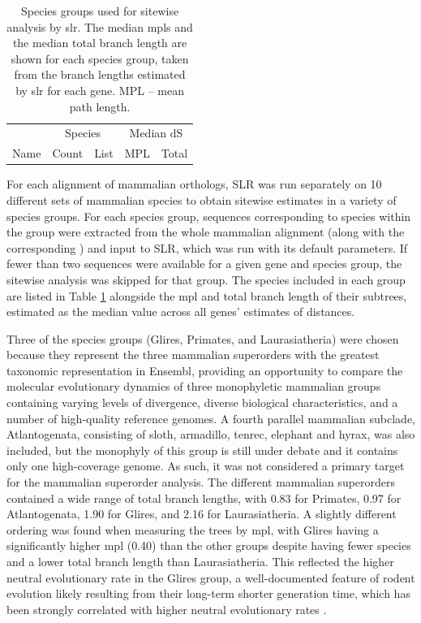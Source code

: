 \begin{table}
\centering \footnotesize
\begin{tabular}{lrb{8cm}rr}
\toprule
 & \multicolumn{2}{c}{Species} & \multicolumn{2}{c}{Median dS} \\
\cmidrule(r){2-3} \cmidrule{4-5}
Name & Count & List & MPL & Total \\
  \midrule

\bottomrule
\end{tabular}
\caption{Species groups used for sitewise analysis by \ac{slr}. The
  median \acp{mpl} and the median total branch length are shown for
  each species group, taken from the \ntrees branch lengths estimated
  by \ac{slr} for each gene. MPL -- mean path length.}
\label{table_species_set_summary}
\end{table}

For each alignment of mammalian orthologs, SLR was run separately on
10 different sets of mammalian species to obtain sitewise estimates in
a variety of species groups. For each species group, sequences
corresponding to species within the group were extracted from the
whole mammalian alignment (along with the corresponding \subtr) and
input to SLR, which was run with its default parameters. If fewer than
two sequences were available for a given gene and species group, the
sitewise analysis was skipped for that group. The species included in
each group are listed in Table \ref{table_species_set_summary}
alongside the \acf{mpl} and total branch length of their subtrees,
estimated as the median value across all \ntrees genes' estimates of
\ds distances.

Three of the species groups (Glires, Primates, and Laurasiatheria) were
chosen because they represent the three mammalian superorders with the
greatest taxonomic representation in Ensembl, providing an opportunity
to compare the molecular evolutionary dynamics of three monophyletic
mammalian groups containing varying levels of divergence, diverse
biological characteristics, and a number of high-quality reference
genomes. A fourth parallel mammalian subclade, Atlantogenata,
consisting of sloth, armadillo, tenrec, elephant and hyrax, was also
included, but the monophyly of this group is still under debate
\citep{Murphy2007,Churakov2009} and it contains only one high-coverage
genome. As such, it was not considered a primary target for the
mammalian superorder analysis. The different mammalian superorders
contained a wide range of total branch lengths, with 0.83 for
Primates, 0.97 for Atlantogenata, 1.90 for Glires, and 2.16 for
Laurasiatheria. A slightly different ordering was found when measuring
the trees by \ac{mpl}, with Glires having a significantly higher
\ac{mpl} (0.40) than the other groups despite having fewer species and
a lower total branch length than Laurasiatheria. This reflected the
higher neutral evolutionary rate in the Glires group, a
well-documented feature of rodent evolution likely resulting from
their long-term shorter generation time, which has been strongly
correlated with higher neutral evolutionary rates
\citep{Nikolaev2007,Smith2008}.

